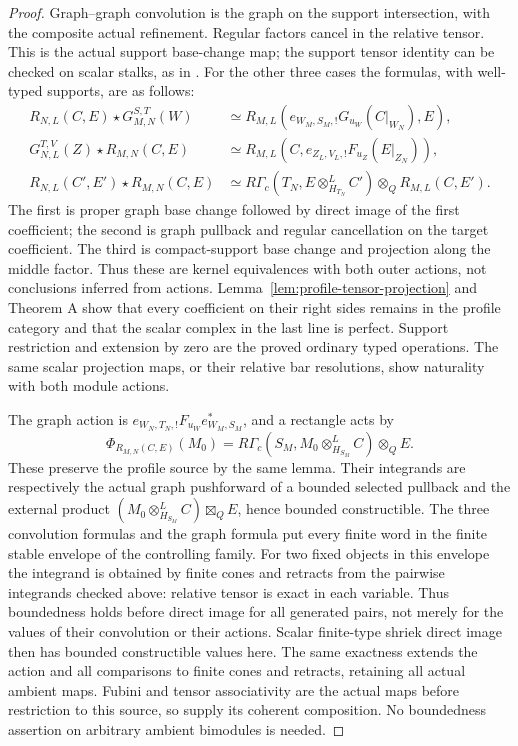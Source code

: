 \documentclass[11pt]{article}
\theoremstyle{definition}
\theoremstyle{remark}
\begin{document}
\begin{proof}
Graph--graph convolution is the graph on the support intersection,
with the composite actual refinement.  Regular factors cancel in
the relative tensor.  This is the actual support base-change map;
the support tensor identity can be checked on scalar stalks, as
in \cite[\texttt{lem:support-intersection}]{Kernels}.
For the other three cases the formulas, with well-typed supports,
are as follows:
\[
 \begin{aligned}
 R_{N,L}(C,E)\star G_{M,N}^{S,T}(W)
  &\simeq R_{M,L}
       (e_{W_M,S_M,!}G_{u_W}(C|_{W_N}),E),\\
 G_{N,L}^{T,V}(Z)\star R_{M,N}(C,E)
  &\simeq R_{M,L}
       (C,e_{Z_L,V_L,!}F_{u_Z}(E|_{Z_N})),\\
 R_{N,L}(C',E')\star R_{M,N}(C,E)
  &\simeq R\Gamma_c(T_N,E\otimes^L_{H_{T_N}}C')
                         \otimes_Q R_{M,L}(C,E').
 \end{aligned}
\]
The first is proper graph base change followed by direct image of
the first coefficient; the second is graph pullback and regular
cancellation on the target coefficient.  The third is compact-support
base change and projection along the middle factor.  Thus these are
kernel equivalences with both outer actions, not conclusions inferred
from actions.  Lemma~\ref{lem:profile-tensor-projection} and Theorem A
show that every coefficient on their right sides remains in the
profile category and that the scalar complex in the last line is
perfect.  Support restriction and extension by zero are the proved
ordinary typed operations.  The same scalar projection maps, or their
relative bar resolutions, show naturality with both module actions.

The graph action is
$e_{W_N,T_N,!}F_{u_W}e_{W_M,S_M}^*$, and a rectangle acts by
\[
 \Phi_{R_{M,N}(C,E)}(M_0)
   =R\Gamma_c(S_M,M_0\otimes^L_{H_{S_M}}C)\otimes_Q E.
\]
These preserve the profile source by the same lemma.  Their integrands
are respectively the actual graph pushforward of a bounded selected
pullback and the external product
$(M_0\otimes_{H_{S_M}}^LC)\boxtimes_Q E$, hence bounded constructible.
The three convolution formulas and the graph formula put every
finite word in the finite stable envelope of the controlling family.
For two fixed objects in this envelope the integrand is obtained by
finite cones and retracts from the pairwise integrands checked above:
relative tensor is exact in each variable. Thus boundedness holds
before direct image for all generated pairs, not merely for the
values of their convolution or their actions. Scalar finite-type
shriek direct image then has bounded constructible values here.
The same exactness extends the action and all comparisons to finite
cones and retracts, retaining all actual ambient maps.
Fubini and tensor associativity are the actual maps before restriction
to this source, so supply its coherent composition.  No boundedness
assertion on arbitrary ambient bimodules is needed.
\end{proof}
\end{document}
